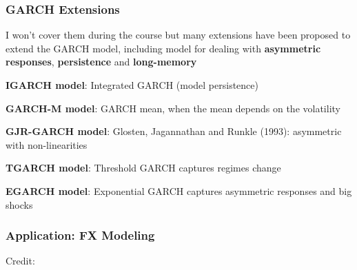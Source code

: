 \documentclass{beamer}
\newenvironment{wideitemize}{\itemize\addtolength{\itemsep}{10pt}}{\enditemize}
\begin{document}
\begin{frame}
  \frametitle{GARCH Extensions}
  \begin{wideitemize}
  \item I won't cover them during the course but many extensions have been proposed to extend the GARCH model, including model for dealing with \textbf{asymmetric responses}, \textbf{persistence} and \textbf{long-memory}
    \begin{wideitemize}
      \item \textbf{IGARCH model}: Integrated GARCH (model persistence)
      \item \textbf{GARCH-M model}: GARCH mean, when the mean depends on the volatility
      \item \textbf{GJR-GARCH model}: Glosten, Jagannathan and Runkle (1993): asymmetric with non-linearities
      \item \textbf{TGARCH model}: Threshold GARCH captures regimes change
      \item \textbf{EGARCH model}: Exponential GARCH captures asymmetric responses and big shocks
    \end{wideitemize}
  \end{wideitemize}
\end{frame}


\begin{frame}
  \frametitle{Application: FX Modeling}
  \hspace*{15pt}\hbox{\scriptsize Credit:}          
\end{frame}
\end{document}
